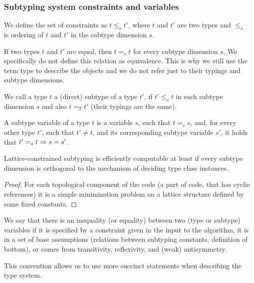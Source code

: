 \subsubsection{Subtyping system constraints and variables}

\begin{defn}
    We define the set of constraints as $t \leq_s t'$, where $t$ and $t'$ are two types and $\leq_s$ is ordering of $t$ and $t'$ in the subtype dimension $s$.
\end{defn}

\begin{defn}
    If two types $t$ and $t'$ are equal, then $t =_s t$ for every subtype dimension $s$. We specifically do not define this relation as equivalence. This is why we still use the term type to describe the objects and we do not refer just to their typings and subtype dimensions.
\end{defn}

\begin{defn}
    We call a type $t$ a (direct) subtype of a type $t'$, if $t' \leq_s t$ in each subtype dimension $s$ and also $t =_T t'$ (their typings are the same).
\end{defn}

\begin{defn}
    A subtype variable of a type $t$ is a variable $s$, such that $t =_s s$, and, for every other type $t'$, such that $t' \neq t$, and its corresponding subtype variable $s'$, it holds that $t' =_s t \Rightarrow s = s'$.
\end{defn}

\begin{lemma}
    Lattice-constrained subtyping is efficiently computable at least if every subtype dimension is orthogonal to the mechanism of deciding type class instances.
\end{lemma}

\begin{proof}
    For each topological component of the code (a part of code, that has cyclic references) it is a simple minimization problem on a lattice structure defined by some fixed constants.
\end{proof}

\begin{remark}
    We say that there is an inequality (or equality) between two (type or subtype) variables if it is specified by a constraint given in the input to the algorithm, it is in a set of base assumptions (relations between subtyping constants, definition of bottom), or comes from transitivity, reflexivity, and (weak) antisymmetry.

    This convention allows us to use more succinct statements when describing the type system.
\end{remark}

